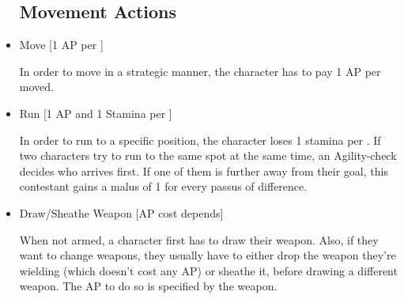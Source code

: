\begin{itemize}
\subsection{Movement Actions}

\item Move [1 AP per ]

In order to move in a strategic manner, the character has to pay 1 AP per  moved. 



\item Run [1 AP and 1 Stamina per ]

In order to run to a specific position, the character loses 1 stamina per . If two characters try to run to the same spot at the same time, an Agility-check decides who arrives first. If one of them is further away from their goal, this contestant gains a malus of 1 for every passus of difference.


\item Draw/Sheathe Weapon [AP cost depends]

When not armed, a character first has to draw their weapon. Also, if they want to change weapons, they usually have to either drop the weapon they're wielding (which doesn't cost any AP) or sheathe it, before drawing a different weapon. The AP to do so is specified by the weapon.


\end{itemize}